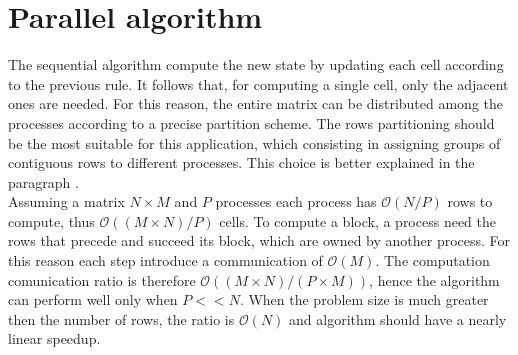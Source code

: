 \documentclass{article}
\begin{document}
\section{Parallel algorithm} \label{sec:parallelalgorithm}
The sequential algorithm compute the new state by updating each cell according to the previous rule. It follows that, for computing a single cell, only the adjacent ones are needed. For this reason, the entire matrix can be distributed among the processes according to a precise partition scheme. The rows partitioning should be the most suitable for this application, which consisting in assigning groups of contiguous rows to different processes. This choice is better explained in the paragraph . \\
Assuming a matrix $N \times M$ and $P$ processes each process has $\mathcal{O}(N / P)$ rows to compute, thus $\mathcal{O}((M \times N) / P)$ cells. To compute a block, a process need the rows that precede and succeed its block, which are owned by another process. For this reason each step introduce a communication of $\mathcal{O}(M)$. The computation comunication ratio is therefore $\mathcal{O}((M \times N) / (P \times M))$, hence the algorithm can perform well only when $P << N$. When the problem size is much greater then the number of rows, the ratio is $\mathcal{O}(N)$ and algorithm should have a nearly linear speedup.
\end{document}
